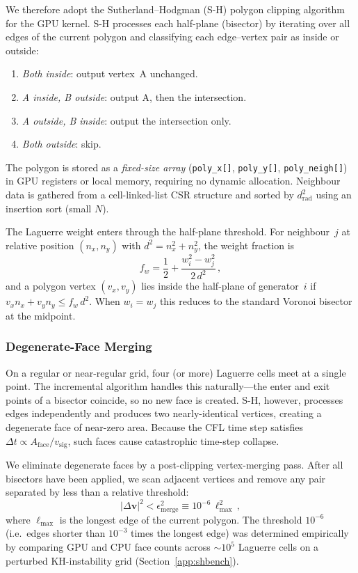 \documentclass[twocolumn]{aastex63}
\newcommand{\vect}[1]{\mathbf{#1}}
\begin{document}
We therefore adopt the Sutherland--Hodgman (S-H) polygon clipping
algorithm \citep{1974CGIP....3..544S} for the GPU kernel.  S-H processes
each half-plane (bisector) by iterating over all edges of the current
polygon and classifying each edge--vertex pair as inside or outside:
\begin{enumerate}[nosep]
  \item \emph{Both inside}: output vertex~A unchanged.
  \item \emph{A inside, B outside}: output A, then the intersection.
  \item \emph{A outside, B inside}: output the intersection only.
  \item \emph{Both outside}: skip.
\end{enumerate}
The polygon is stored as a \emph{fixed-size array}
(\texttt{poly\_x[]}, \texttt{poly\_y[]}, \texttt{poly\_neigh[]}) in
GPU registers or local memory, requiring no dynamic allocation.
Neighbour data is gathered from a cell-linked-list CSR structure
and sorted by $d_{\mathrm{rad}}^2$ using an insertion sort (small $N$).

The Laguerre weight enters through the half-plane threshold.  For
neighbour~$j$ at relative position $(n_x, n_y)$ with
$d^2 = n_x^2 + n_y^2$, the weight fraction is
\begin{equation}
  f_w = \frac{1}{2} + \frac{w_i^2 - w_j^2}{2\,d^2}\,,
\end{equation}
and a polygon vertex $(v_x, v_y)$ lies inside the half-plane of
generator~$i$ if $v_x n_x + v_y n_y \le f_w \, d^2$.  When
$w_i = w_j$ this reduces to the standard Voronoi bisector at the
midpoint.

\subsubsection{Degenerate-Face Merging}

On a regular or near-regular grid, four (or more) Laguerre cells
meet at a single point.  The incremental algorithm handles this
naturally---the enter and exit points of a bisector coincide, so no
new face is created.  S-H, however, processes edges independently
and produces two nearly-identical vertices, creating a degenerate
face of near-zero area.  Because the CFL time step satisfies
$\Delta t \propto A_{\mathrm{face}} / v_{\mathrm{sig}}$, such
faces cause catastrophic time-step collapse.

We eliminate degenerate faces by a post-clipping vertex-merging pass.
After all bisectors have been applied, we scan adjacent vertices and
remove any pair separated by less than a relative threshold:
\begin{equation}
  |\Delta\vect{v}|^2 < \epsilon_{\mathrm{merge}}^2
  \equiv 10^{-6}\,\ell_{\max}^2\,,
  \label{eq:mergeeps}
\end{equation}
where $\ell_{\max}$ is the longest edge of the current polygon.  The
threshold $10^{-6}$ (i.e.\ edges shorter than $10^{-3}$
times the longest edge) was determined empirically by comparing GPU
and CPU face counts across $\sim\!10^5$ Laguerre cells on a
perturbed KH-instability grid (Section~\ref{app:shbench}).
\end{document}
